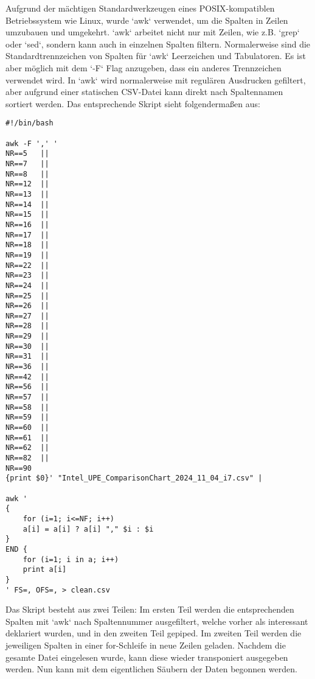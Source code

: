 Aufgrund der mächtigen Standardwerkzeugen eines POSIX-kompatiblen Betriebssystem wie Linux, wurde `awk` verwendet, um die Spalten in Zeilen umzubauen und umgekehrt.
`awk` arbeitet nicht nur mit Zeilen, wie z.B. `grep` oder `sed`, sondern kann auch in einzelnen Spalten filtern.
Normalerweise sind die Standardtrennzeichen von Spalten für `awk`  Leerzeichen und Tabulatoren. Es ist aber möglich mit dem `-F` Flag anzugeben, dass ein anderes Trennzeichen verwendet wird.
In `awk` wird normalerweise mit regulären Ausdrucken gefiltert, aber aufgrund einer statischen CSV-Datei kann direkt nach Spaltennamen sortiert werden.
Das entsprechende Skript sieht folgendermaßen aus:

\begin{lstlisting}[caption={\texttt{clean.sh}},captionpos=b]
#!/bin/bash

awk -F ',' '
NR==5   ||
NR==7   ||
NR==8   ||
NR==12  ||
NR==13  ||
NR==14  ||
NR==15  ||
NR==16  ||
NR==17  ||
NR==18  ||
NR==19  ||
NR==22  ||
NR==23  ||
NR==24  ||
NR==25  ||
NR==26  ||
NR==27  ||
NR==28  ||
NR==29  ||
NR==30  ||
NR==31  ||
NR==36  ||
NR==42  ||
NR==56  ||
NR==57  ||
NR==58  ||
NR==59  ||
NR==60  ||
NR==61  ||
NR==62  ||
NR==82  ||
NR==90 
{print $0}' "Intel_UPE_ComparisonChart_2024_11_04_i7.csv" |

awk '
{
	for (i=1; i<=NF; i++)  
	a[i] = a[i] ? a[i] "," $i : $i  
}
END {
	for (i=1; i in a; i++)  
	print a[i]
}
' FS=, OFS=, > clean.csv
\end{lstlisting}

Das Skript besteht aus zwei Teilen: Im ersten Teil werden die entsprechenden Spalten mit `awk` nach Spaltennummer ausgefiltert, welche vorher als interessant deklariert wurden, und in den zweiten Teil gepiped. 
Im zweiten Teil werden die jeweiligen Spalten in einer for-Schleife in neue Zeilen geladen. Nachdem die gesamte Datei eingelesen wurde, kann diese wieder transponiert ausgegeben werden. Nun kann mit dem eigentlichen Säubern der Daten begonnen werden.




